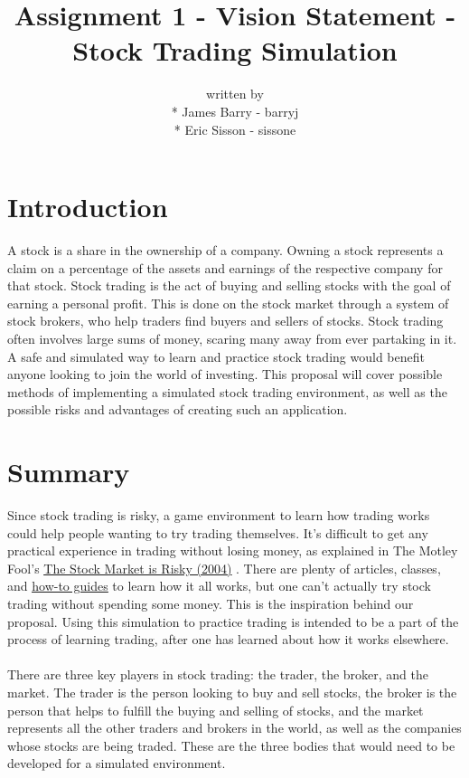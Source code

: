 \documentclass[12pt]{article}
\title{Assignment 1 - Vision Statement - Stock Trading Simulation}
\author{written by \\* James Barry - barryj \\* Eric Sisson - sissone}
\begin{document}
\maketitle
\pagebreak
\tableofcontents
\pagebreak

\section{Introduction}

A stock is a share in the ownership of a company. Owning a stock represents a claim on a percentage of the assets and earnings of the respective company for that stock. Stock trading is the act of buying and selling stocks with the goal of earning a personal profit. This is done on the stock market through a system of stock brokers, who help traders find buyers and sellers of stocks. Stock trading often involves large sums of money, scaring many away from ever partaking in it. A safe and simulated way to learn and practice stock trading would benefit anyone looking to join the world of investing. This proposal will cover possible methods of implementing a simulated stock trading environment, as well as the possible risks and advantages of creating such an application. 

\section{Summary}

Since stock trading is risky, a game environment to learn how trading works could help people wanting to try trading themselves. It's difficult to get any practical experience in trading without losing money, as explained in The Motley Fool's \color{blue}\underline{\href{https://www.fool.com/investing/general/2004/07/09/the-stock-market-is-risky.aspx}{The Stock Market is Risky (2004)}} \color{black}. There are plenty of articles, classes, and \color{blue}\underline{\href{https://www.investopedia.com/university/stocks/}{how-to guides}} \color{black} to learn how it all works, but one can't actually try stock trading without spending some money. This is the inspiration behind our proposal. Using this simulation to practice trading is intended to be a part of the process of learning trading, after one has learned about how it works elsewhere.
\\ \\
There are three key players in stock trading: the trader, the broker, and the market. The trader is the person looking to buy and sell stocks, the broker is the person that helps to fulfill the buying and selling of stocks, and the market represents all the other traders and brokers in the world, as well as the companies whose stocks are being traded. These are the three bodies that would need to be developed for a simulated environment.
\end{document}
